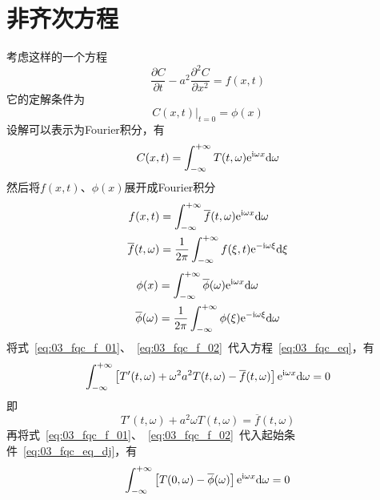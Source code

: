 \section{非齐次方程}
考虑这样的一个方程
\begin{equation}\label{eq:03_fqc_eq}
 \dfrac{\partial C}{\partial t}-a^2\dfrac{\partial^2 C}{\partial x^2}=f(x,t)
\end{equation}
它的定解条件为
\begin{equation}\label{eq:03_fqc_eq_dj}
 \left.C(x,t)\right|_{t=0}=\phi(x)
\end{equation}
设解可以表示为Fourier积分，有
\begin{equation}\label{eq:03_fqc_jie_f}
 C(x,t)=\int_{-\infty}^{+\infty}T(t,\omega)\mathrm{e}^{\mathrm{i}\omega x}\mathrm{d}\omega
\end{equation}
然后将$f(x,t)$、$\phi(x)$展开成Fourier积分
\begin{equation}\label{eq:03_fqc_f_01}
 \begin{split}
  f(x,t)&=\int_{-\infty}^{+\infty}\overline{f}(t,\omega)\mathrm{e}^{\mathrm{i}\omega x}\mathrm{d}\omega\\
  \overline{f}(t,\omega)&=\dfrac{1}{2\pi}\int_{-\infty}^{+\infty}f(\xi,t)\mathrm{e}^{-\mathrm{i}\omega\xi}\mathrm{d}\xi
 \end{split}
\end{equation}
\begin{equation}\label{eq:03_fqc_f_02}
 \begin{split}
  \phi(x)&=\int_{-\infty}^{+\infty}\overline{\phi}(\omega)\mathrm{e}^{\mathrm{i}\omega x}\mathrm{d}\omega\\
  \overline{\phi}(\omega)&=\dfrac{1}{2\pi}\int_{-\infty}^{+\infty}\phi(\xi)\mathrm{e}^{-\mathrm{i}\omega\xi}\mathrm{d}\omega
 \end{split}
\end{equation}
将式~\ref{eq:03_fqc_f_01}、~\ref{eq:03_fqc_f_02}~代入方程~\ref{eq:03_fqc_eq}，有
\begin{equation*}
 \int_{-\infty}^{+\infty}\left[T'(t,\omega)+\omega^2 a^2T(t,\omega)-\overline{f}(t,\omega)\right]\mathrm{e}^{\mathrm{i}\omega x}\mathrm{d}\omega=0
\end{equation*}
即
\begin{equation}\label{eq:03_fqc_f_re}
 T'(t,\omega)+a^2\omega T(t,\omega)=\overline{f}(t,\omega)
\end{equation}
再将式~\ref{eq:03_fqc_f_01}、~\ref{eq:03_fqc_f_02}~代入起始条件~\ref{eq:03_fqc_eq_dj}，有
\begin{equation*}
 \int_{-\infty}^{+\infty}\left[T(0,\omega)-\overline{\phi}(\omega)\right]\mathrm{e}^{\mathrm{i}\omega x}\mathrm{d}\omega=0
\end{equation*}
